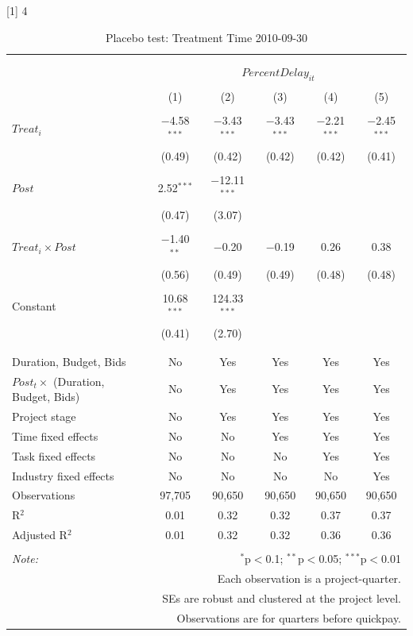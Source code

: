 \documentclass[
]{article}
\begin{document}
{[}1{]} 4

\begin{table}[H] \centering 
  \caption{Placebo test: Treatment Time 2010-09-30} 
  \label{} 
\small 
\begin{tabular}{@{\extracolsep{-2pt}}lccccc} 
\\[-1.8ex]\hline 
\hline \\[-1.8ex] 
\\[-1.8ex] & \multicolumn{5}{c}{$PercentDelay_{it}$} \\ 
\\[-1.8ex] & (1) & (2) & (3) & (4) & (5)\\ 
\hline \\[-1.8ex] 
 $Treat_i$ & $-$4.58$^{***}$ & $-$3.43$^{***}$ & $-$3.43$^{***}$ & $-$2.21$^{***}$ & $-$2.45$^{***}$ \\ 
  & (0.49) & (0.42) & (0.42) & (0.42) & (0.41) \\ 
  & & & & & \\ 
 $Post$ & 2.52$^{***}$ & $-$12.11$^{***}$ &  &  &  \\ 
  & (0.47) & (3.07) &  &  &  \\ 
  & & & & & \\ 
 $Treat_i \times Post$ & $-$1.40$^{**}$ & $-$0.20 & $-$0.19 & 0.26 & 0.38 \\ 
  & (0.56) & (0.49) & (0.49) & (0.48) & (0.48) \\ 
  & & & & & \\ 
 Constant & 10.68$^{***}$ & 124.33$^{***}$ &  &  &  \\ 
  & (0.41) & (2.70) &  &  &  \\ 
  & & & & & \\ 
\hline \\[-1.8ex] 
Duration, Budget, Bids & No & Yes & Yes & Yes & Yes \\ 
$Post_t \times$  (Duration, Budget, Bids) & No & Yes & Yes & Yes & Yes \\ 
Project stage & No & Yes & Yes & Yes & Yes \\ 
Time fixed effects & No & No & Yes & Yes & Yes \\ 
Task fixed effects & No & No & No & Yes & Yes \\ 
Industry fixed effects & No & No & No & No & Yes \\ 
Observations & 97,705 & 90,650 & 90,650 & 90,650 & 90,650 \\ 
R$^{2}$ & 0.01 & 0.32 & 0.32 & 0.37 & 0.37 \\ 
Adjusted R$^{2}$ & 0.01 & 0.32 & 0.32 & 0.36 & 0.36 \\ 
\hline 
\hline \\[-1.8ex] 
\textit{Note:}  & \multicolumn{5}{r}{$^{*}$p$<$0.1; $^{**}$p$<$0.05; $^{***}$p$<$0.01} \\ 
 & \multicolumn{5}{r}{Each observation is a project-quarter.} \\ 
 & \multicolumn{5}{r}{SEs are robust and clustered at the project level.} \\ 
 & \multicolumn{5}{r}{Observations are for quarters before quickpay.} \\ 
\end{tabular} 
\end{table}
\end{document}
